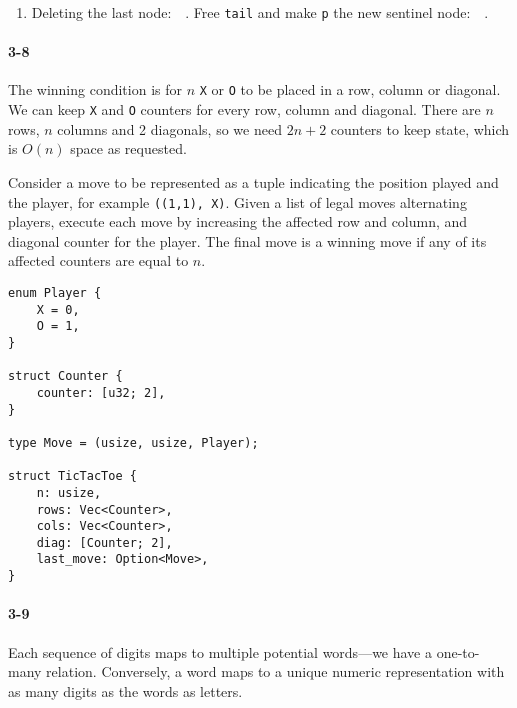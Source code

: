 \documentclass{report}
\begin{document}
\begin{enumerate}[label=\arabic*)]
    \item Deleting the last node:\ %
    \,. Free \lstinline!tail! and make \lstinline!p! the new sentinel node:\ %
    \,.
\end{enumerate}

\paragraph{3-8} The winning condition is for $n$ \lstinline!X! or \lstinline!O! to be placed in a row, column or diagonal. We can keep \lstinline!X! and \lstinline!O! counters for every row, column and diagonal. There are $n$ rows, $n$ columns and 2 diagonals, so we need $2n+2$ counters to keep state, which is $O(n)$ space as requested.

Consider a move to be represented as a tuple indicating the position played and the player, for example \lstinline!((1,1), X)!. Given a list of legal moves alternating players, execute each move by increasing the affected row and column, and diagonal counter for the player. The final move is a winning move if any of its affected counters are equal to $n$.

\begin{lstlisting}
enum Player {
    X = 0,
    O = 1,
}

struct Counter {
    counter: [u32; 2],
}

type Move = (usize, usize, Player);

struct TicTacToe {
    n: usize,
    rows: Vec<Counter>,
    cols: Vec<Counter>,
    diag: [Counter; 2],
    last_move: Option<Move>,
}
\end{lstlisting}

\paragraph{3-9} Each sequence of digits maps to multiple potential words---we have a one-to-many relation. Conversely, a word maps to a unique numeric representation with as many digits as the words as letters.
\end{document}
